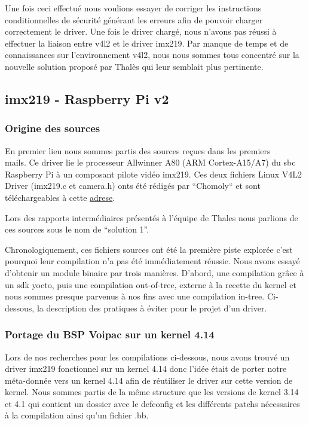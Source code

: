 {Une fois ceci effectué nous voulions essayer de corriger les instructions conditionnelles de
sécurité générant les erreurs afin de pouvoir charger correctement le driver. Une fois le
driver chargé, nous n’avons pas réussi à effectuer la liaison entre v4l2 et le driver imx219.
Par manque de temps et de connaissances sur l’environnement v4l2, nous nous sommes
tous concentré sur la nouvelle solution proposé par Thalès qui leur semblait plus
pertinente.

\subsection{imx219 - Raspberry Pi v2}

\subsubsection{Origine des sources}
En premier lieu nous sommes partis des sources reçues dans les premiers \\
mails. Ce driver lie le processeur Allwinner A80 (ARM Cortex-A15/A7) du sbc Raspberry Pi à un
composant pilote vidéo imx219. Ces deux fichiers Linux V4L2 Driver (imx219.c et
camera.h) onts été rédigés par “Chomoly“ et sont téléchargeables à cette 
\href{https://www.raspberrypi.org/forums/viewtopic.php?f=43&t=162722}{adrese}. \medskip

Lors des rapports intermédiaires présentés à l’équipe de Thales nous parlions de ces
sources sous le nom de “solution 1”. \medskip

Chronologiquement, ces fichiers sources ont été la première piste explorée c’est pourquoi
leur compilation n’a pas été immédiatement réussie. Nous avons essayé d’obtenir un
module binaire par trois manières. D’abord, une compilation grâce à un sdk yocto, puis
une compilation out-of-tree, externe à la recette du kernel et nous sommes presque
parvenus à nos fins avec une compilation in-tree. Ci-dessous, la description des pratiques
à éviter pour le projet d’un driver.

\subsubsection{Portage du BSP Voipac sur un kernel 4.14}

Lors de nos recherches pour les compilations ci-dessous, nous avons trouvé un driver
imx219 fonctionnel sur un kernel 4.14 donc l’idée était de porter notre méta-donnée vers
un kernel 4.14 afin de réutiliser le driver sur cette version de kernel.
Nous sommes partis de la même structure que les versions de kernel 3.14 et 4.1 qui
contient un dossier avec le defconfig et les différents patchs nécessaires à la compilation
ainsi qu’un fichier .bb.

}
